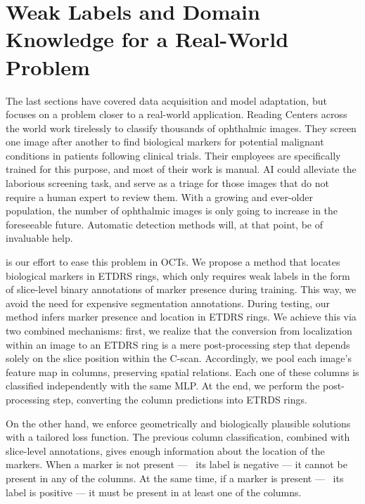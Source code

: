 \section{Weak Labels and Domain Knowledge for a Real-World Problem}\label{sec:disc_oct}

The last sections have covered data acquisition and model adaptation, but  focuses on a problem closer to a real-world application. Reading Centers across the world work tirelessly to classify thousands of ophthalmic images. They screen one image after another to find biological markers for potential malignant conditions in patients following clinical trials. Their employees are specifically trained for this purpose, and most of their work is manual. AI could alleviate the laborious screening task, and serve as a triage for those images that do not require a human expert to review them. With a growing and ever-older population, the number of ophthalmic images is only going to increase in the foreseeable future. Automatic detection methods will, at that point, be of invaluable help.

 is our effort to ease this problem in OCTs. We propose a method that locates biological markers in ETDRS rings, which only requires weak labels in the form of slice-level binary annotations of marker presence during training. This way, we avoid the need for expensive segmentation annotations. During testing, our method infers marker presence and location in ETDRS rings. We achieve this via two combined mechanisms: first, we realize that the conversion from localization within an image to an ETDRS ring is a mere post-processing step that depends solely on the slice position within the C-scan. Accordingly, we pool each image's feature map in columns, preserving spatial relations. Each one of these columns is classified independently with the same MLP. At the end, we perform the post-processing step, converting the column predictions into ETRDS rings.

On the other hand, we enforce geometrically and biologically plausible solutions with a tailored loss function. The previous column classification, combined with slice-level annotations, gives enough information about the location of the markers. When a marker is not present --- \ie~its label is negative --- it cannot be present in any of the columns. At the same time, if a marker is present --- \ie~its label is positive --- it must be present in at least one of the columns. 

